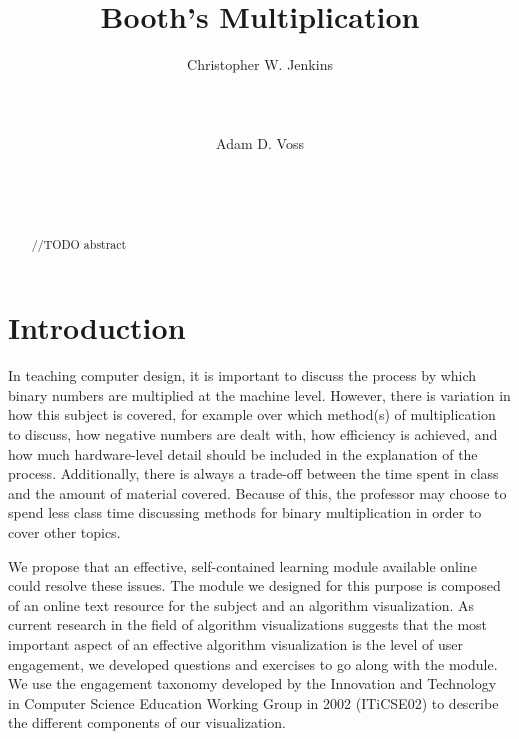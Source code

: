 \documentclass{acm_proc_article-sp}
\begin{document}
\title{Booth's Multiplication}

\author{
    \alignauthor
    Christopher W.
Jenkins\\
       \\
       \\
       \\
    \alignauthor
    Adam D.
Voss\\
       \\
       \\
       \\
}

\maketitle

\begin{abstract}
//TODO abstract
\end{abstract}

\section{Introduction}
In teaching computer design, it is important to discuss the process by which binary numbers are multiplied at the machine level.
However, there is variation in how this subject is covered, for example over which method(s) of multiplication to discuss, how negative numbers are dealt with, how efficiency is achieved, and how much hardware-level detail should be included in the explanation of the process.
Additionally, there is always a trade-off between the time spent in class and the amount of material covered.
Because of this, the professor may choose to spend less class time discussing methods for binary multiplication in order to cover other topics.

We propose that an effective, self-contained learning module available online could resolve these issues.
The module we designed for this purpose is composed of an online text resource for the subject and an algorithm visualization.
As current research in the field of algorithm visualizations suggests that the most important aspect of an effective algorithm visualization is the level of user engagement\cite{ExploringAV}, we developed questions and exercises to go along with the module.
We use the engagement taxonomy developed by the Innovation and Technology in Computer Science Education Working Group in 2002 (ITiCSE02) to describe the different components of our visualization.
\end{document}
